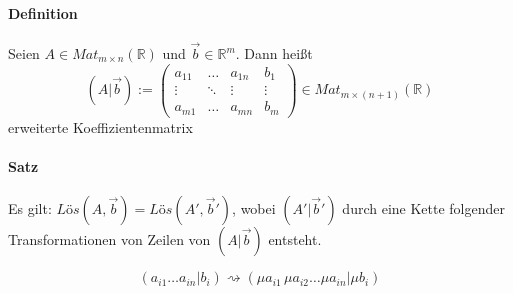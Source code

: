 \documentclass[a4paper,12pt]{article}
\begin{document}
\paragraph{Definition}
Seien $A\in Mat_{m\times n}(\mathbb{R})$ und $\vec{b}\in\mathbb{R}^m$. Dann heißt
$$(A\vert\vec{b}):=\left(\begin{array}{ccc|c}
      a_{11} & \dots  & a_{1n} & b_ 1   \\
      \vdots & \ddots & \vdots & \vdots \\
      a_{m1} & \dots  & a_{mn} & b_m
    \end{array}\right)\in Mat_{m
      \times(n+1)}(\mathbb{R})$$ erweiterte Koeffizientenmatrix

\paragraph{Satz} Es gilt: $Lös(A,\vec{b})=Lös(A',\vec{b}')$, wobei $(A'\vert\vec{b}')$ durch
eine Kette folgender Transformationen von Zeilen von $(A\vert\vec{b})$ entsteht.

$$\tag{(I)}(a_{i1}\dots a_{in}\vert b_{i})\rightsquigarrow(\mu a_{i1}\,\mu a_{i2}\dots\mu a_{in}\vert \mu b_i)$$
\end{document}
